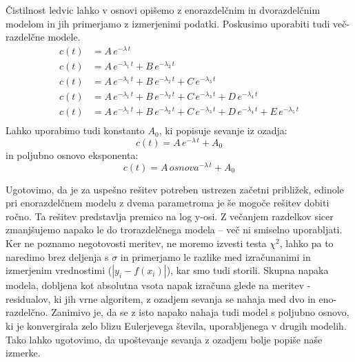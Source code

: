 Čistilnost ledvic lahko v osnovi opišemo z enorazdelčnim in dvorazdelčnim modelom in jih primerjamo z izmerjenimi podatki. Poskusimo uporabiti tudi več-razdelčne modele.
\begin{align}
    c(t) &= A \, e^{-\lambda \, t} \\ \nonumber
    c(t) &= A \, e^{-\lambda_1 \, t} + B \, e^{-\lambda_2 \, t} \\ \nonumber
    c(t) &= A \, e^{-\lambda_1 \, t} + B \, e^{-\lambda_2 \, t} + C \, e^{-\lambda_3 \, t} \\ \nonumber
    c(t) &= A \, e^{-\lambda_1 \, t} + B \, e^{-\lambda_2 \, t} + C \, e^{-\lambda_3 \, t} + D \, e^{-\lambda_4 \, t} \\ \nonumber
    c(t) &= A \, e^{-\lambda_1 \, t} + B \, e^{-\lambda_2 \, t} + C \, e^{-\lambda_3 \, t} + D \, e^{-\lambda_4 \, t} + E \, e^{-\lambda_5 \, t} \\ \nonumber
\end{align}
Lahko uporabimo tudi konstanto $A_0$, ki popisuje sevanje iz ozadja:
\begin{equation}
    c(t) = A \, e^{-\lambda \, t} + A_0
\end{equation}
in poljubno osnovo eksponenta:
\begin{equation}
    c(t) = A \, osnova^{-\lambda \, t} +A_0
\end{equation}

Ugotovimo, da je za uspešno rešitev potreben ustrezen začetni približek, edinole pri enorazdelčnem modelu z dvema parametroma je še mogoče rešitev dobiti ročno. Ta rešitev predstavlja premico na log y-osi. Z večanjem razdelkov sicer zmanjšujemo napako le do trorazdelčnega modela -- več ni smiselno uporabljati. Ker ne poznamo negotovosti meritev, ne moremo izvesti testa $\chi^2$, lahko pa to naredimo brez deljenja s $\sigma$ in primerjamo le razlike med izračunanimi in izmerjenim vrednostimi ($|y_i - f(x_i)|$), kar smo tudi storili. Skupna napaka modela, dobljena kot absolutna vsota napak izračuna glede na meritev - residualov, ki jih vrne algoritem, z ozadjem sevanja se nahaja med dvo in eno-razdelčno. Zanimivo je, da se z isto napako nahaja tudi model s poljubno osnovo, ki je konvergirala zelo blizu Eulerjevega števila, uporabljenega v drugih modelih. Tako lahko ugotovimo, da upoštevanje sevanja z ozadjem bolje popiše naše izmerke.

